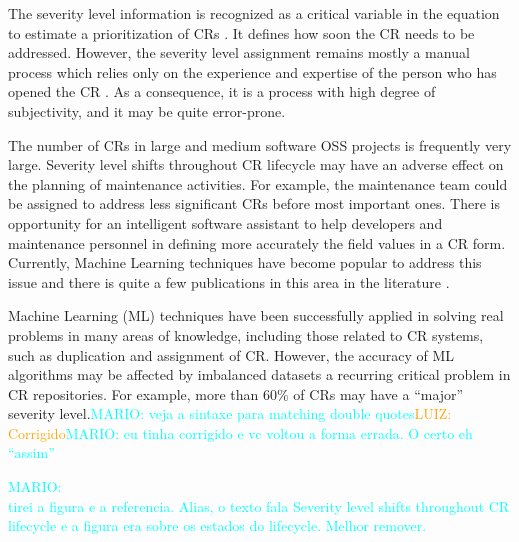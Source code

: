 \documentclass[10pt, conference]{IEEEtran}
\newcommand{\luiz}[1]{\noindent\textcolor{orange}{LUIZ: {#1}}}
\newcommand{\mario}[1]{\noindent\textcolor{cyan}{MARIO: {#1}}}
\newcommand{\luiz}[1]{}
\newcommand{\mario}[1]{}
\begin{document}
The severity level information is recognized as a critical variable in the equation to estimate a prioritization of CRs \cite{Tian2012}. It defines how soon the CR needs to be addressed\cite{Lamkanfi2010}. However, the severity level assignment remains mostly a manual process which relies only on the experience and expertise of the person who has opened the CR \cite{Cavalcanti2014, Tian2012, Lamkanfi2010}. As a consequence, it is a process with high degree of subjectivity, and it may be quite error-prone. 

The number of CRs in large and medium software OSS projects \cite{Lamkanfi2011} is frequently very large. Severity level shifts throughout CR lifecycle may have an adverse effect on the planning of maintenance activities. For example, the maintenance team could be assigned to address less significant CRs before  most important ones. There is opportunity for an intelligent software assistant to help developers and maintenance personnel in defining more accurately the field values in a CR form. Currently, Machine Learning techniques have become popular to address this issue and there is quite a few publications in this area in the literature \cite{Cavalcanti2014}.


Machine Learning (ML) techniques have been successfully applied in solving real problems in many areas of knowledge, including those related to CR systems, such as duplication and assignment of CR\cite{Cavalcanti2014}. However, the accuracy of ML algorithms may be affected by imbalanced datasets \cite{Chawla2009} \textemdash  a recurring critical problem in CR repositories\cite{Tian2015}. For example, more than 60\% of CRs may have a ``major'' severity level.\mario{veja a sintaxe para matching double quotes}\luiz{Corrigido}\mario{eu tinha corrigido e vc voltou a forma errada. O certo eh ``assim''}


\mario{\\ tirei a figura e a referencia. Alias, o texto fala Severity level shifts throughout CR lifecycle e a figura era sobre os estados do lifecycle. Melhor remover.}

%    
\end{document}
